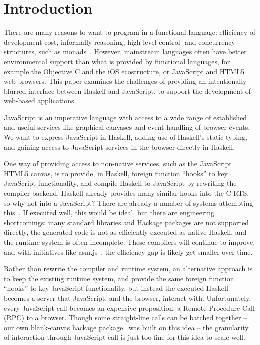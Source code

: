 \documentclass{llncs}
\begin{document}
\section{Introduction}\label{sec:intro}

There are many reasons to want to program in a functional language:
efficiency of development cost, informally reasoning, high-level 
control- and concurrency-structures, such as monads~\cite{...}.
However, mainstream languages often have better environmental support
than what is provided by functional languages,
for example the Objective C and the iOS ecostructure, or JavaScript and HTML5
web browsers.
This paper examines the challenges of providing
an intentionally blurred interface between Haskell
and JavaScript, to support the development of web-based applications.

JavaScript is an imperative language with access to a wide range
of established and useful services like graphical canvases and event
handling of browser events. 
We want to express JavaScript in Haskell, adding use
of Haskell's static typing, and gaining access to JavaScript services
in the browser directly in Haskell.


One way of providing access to non-native services,
such as the JavaScript HTML5 canvas, is to provide, in Haskell, 
foreign function ``hooks'' to key JavaScript functionality,
and compile Haskell to JavaScript by rewriting the
compiler backend.
Haskell already provides many similar hooks into the C RTS,
so why not into a JavaScript?
There are already a number of systems attempting this~\cite{...}.
If executed well, this would be ideal,
but there are engineering shortcomings: 
many standard libraries and Hackage packages are not supported directly,
the generated code is not as efficiently executed as native Haskell, and
the runtime system is often incomplete. These compilers will continue
to improve, and with initiatives like asm.js~\cite{...},
the efficiency gap is likely get smaller over time.

Rather than rewrite the compiler and runtime system,
an alternative approach is to keep the existing
runtime system, and provide the same 
foreign function ``hooks'' to key JavaScript functionality,
but instead the executed Haskell becomes a server that JavaScript,
and the browser, interact with.
Unfortunately, every JavaScript call becomes an expensive proposition: a Remote Procedure Call (RPC)
to a browser.
Though some straight-line calls can be batched together --
our own blank-canvas hackage package~\cite{Hackage:11:blank-canvas} was built on this idea --
the granularity of interaction through JavaScript call is just too fine for
this idea to scale well.
\end{document}
